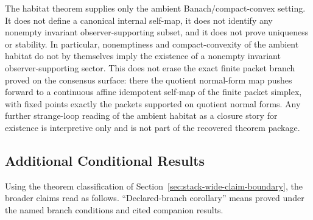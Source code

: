 The habitat theorem supplies only the ambient Banach/compact-convex setting. It does not define a
canonical internal self-map, it does not identify any nonempty invariant observer-supporting subset,
and it does not prove uniqueness or stability. In particular, nonemptiness and compact-convexity
of the ambient habitat do not by themselves imply the existence of a nonempty invariant
observer-supporting sector. This does not erase the exact finite packet branch proved on the
consensus surface: there the quotient normal-form map pushes forward to a continuous
affine idempotent self-map of the finite packet simplex, with fixed points exactly the packets
supported on quotient normal forms. Any further strange-loop reading of the ambient habitat as a
closure story for existence is interpretive only and is not part of the recovered theorem package.

\subsection{Additional Conditional Results}

Using the theorem classification of
Section~\ref{sec:stack-wide-claim-boundary}, the broader claims read as
follows. ``Declared-branch corollary'' means proved under the named branch
conditions and cited companion results.

